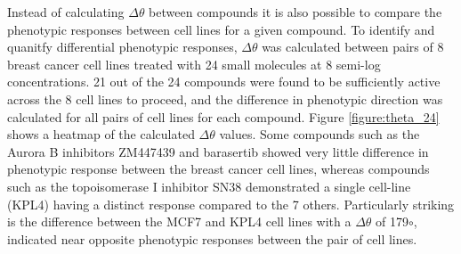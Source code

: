 \documentclass[a4paper,11pt,twoside,openright]{scrbook}
\begin{document}
Instead of calculating $\Delta\theta$ between compounds it is also possible to compare the phenotypic responses between cell lines for a given compound.
To identify and quanitfy differential phenotypic responses, $\Delta\theta$ was calculated between pairs of 8 breast cancer cell lines treated with 24 small molecules at 8 semi-log concentrations.
21 out of the 24 compounds were found to be sufficiently active across the 8 cell lines to proceed, and the difference in phenotypic direction was calculated for all pairs of cell lines for each compound.
Figure \ref{figure:theta_24} shows a heatmap of the calculated $\Delta\theta$ values.
Some compounds such as the Aurora B inhibitors ZM447439 and barasertib showed very little difference in phenotypic response between the breast cancer cell lines, whereas compounds such as the topoisomerase I inhibitor SN38 demonstrated a single cell-line (KPL4) having a distinct response compared to the 7 others.
Particularly striking is the difference between the MCF7 and KPL4 cell lines with a $\Delta\theta$ of 179$\circ$, indicated near opposite phenotypic responses between the pair of cell lines.
\end{document}
